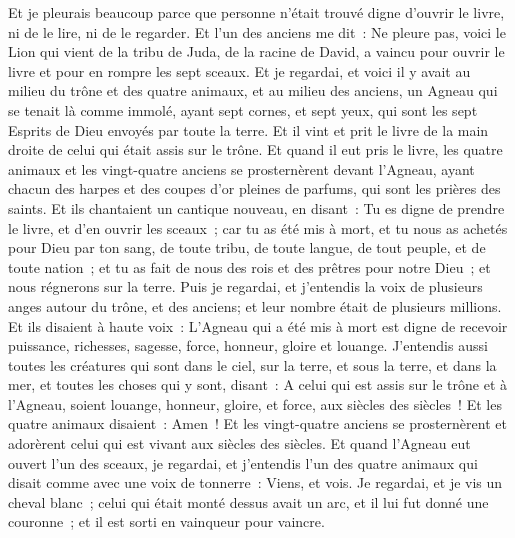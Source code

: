 \begin{multicols}{2}
Et je pleurais beaucoup parce que personne n'était trouvé digne d'ouvrir le livre, ni de le lire, ni de le regarder.
Et l'un des anciens me dit~: Ne pleure pas, voici le Lion qui vient de la tribu de Juda, de la racine de David, a vaincu pour ouvrir le livre et pour en rompre les sept sceaux.
Et je regardai, et voici il y avait au milieu du trône et des quatre animaux, et au milieu des anciens, un Agneau qui se tenait là comme immolé, ayant sept cornes, et sept yeux, qui sont les sept Esprits de Dieu envoyés par toute la terre.
Et il vint et prit le livre de la main droite de celui qui était assis sur le trône.
Et quand il eut pris le livre, les quatre animaux et les vingt-quatre anciens se prosternèrent devant l'Agneau, ayant chacun des harpes et des coupes d'or pleines de parfums, qui sont les prières des saints.
Et ils chantaient un cantique nouveau, en disant~: Tu es digne de prendre le livre, et d'en ouvrir les sceaux~; car tu as été mis à mort, et tu nous as achetés pour Dieu par ton sang, de toute tribu, de toute langue, de tout peuple, et de toute nation~;
et tu as fait de nous des rois et des prêtres pour notre Dieu~; et nous régnerons sur la terre.
Puis je regardai, et j'entendis la voix de plusieurs anges autour du trône, et des anciens; et leur nombre était de plusieurs millions.
Et ils disaient à haute voix~: L'Agneau qui a été mis à mort est digne de recevoir puissance, richesses, sagesse, force, honneur, gloire et louange.
J'entendis aussi toutes les créatures qui sont dans le ciel, sur la terre, et sous la terre, et dans la mer, et toutes les choses qui y sont, disant~: A celui qui est assis sur le trône et à l'Agneau, soient louange, honneur, gloire, et force, aux siècles des siècles~!
Et les quatre animaux disaient~: Amen~! Et les vingt-quatre anciens se prosternèrent et adorèrent celui qui est vivant aux siècles des siècles.
\VerseOne{}Et quand l'Agneau eut ouvert l'un des sceaux, je regardai, et j'entendis l'un des quatre animaux qui disait comme avec une voix de tonnerre~: Viens, et vois.
Je regardai, et je vis un cheval blanc~; celui qui était monté dessus avait un arc, et il lui fut donné une couronne~; et il est sorti en vainqueur pour vaincre.

\end{multicols}
